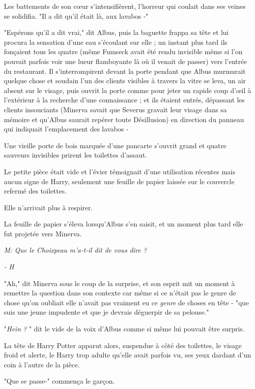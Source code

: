 Les battements de son cœur s'intensifièrent, l'horreur qui coulait dans ses veines se solidifia. "Il a dit qu'il était là, aux lavabos -"

"Espérons qu'il a dit vrai," dit Albus, puis la baguette frappa sa tête et lui procura la sensation d'une eau s'écoulant sur elle ; un instant plus tard ils fonçaient tous les quatre (même Fumseck avait été rendu invisible même si l'on pouvait parfois voir une lueur flamboyante là où il venait de passer) vers l'entrée du restaurant. Il s'interrompirent devant la porte pendant que Albus murmurait quelque chose et soudain l'un des clients visibles à travers la vitre se leva, un air absent sur le visage, puis ouvrit la porte comme pour jeter un rapide coup d'œil à l'extérieur à la recherche d'une connaissance ; et ils étaient entrés, dépassant les clients insouciants (Minerva savait que Severus gravait leur visage dans sa mémoire et qu'Albus saurait repérer toute Désillusion) en direction du panneau qui indiquait l'emplacement des lavabos -

Une vieille porte de bois marquée d'une pancarte s'ouvrit grand et quatre sauveurs invisibles prirent les toilettes d'assaut.

Le petite pièce était vide et l'évier témoignait d'une utilisation récentes mais aucun signe de Harry, seulement une feuille de papier laissée sur le couvercle refermé des toilettes.

Elle n'arrivait plus à respirer.

La feuille de papier s'éleva lorsqu'Albus s'en saisit, et un moment plus tard elle fut projetée vers Minerva.

\emph{M: Que le Choixpeau m'a-t-il dit de vous dire ?} 

\emph{- H} 

"Ah," dit Minerva sous le coup de la surprise, et son esprit mit un moment à remettre la question dans son contexte car même si ce n'était pas le genre de chose qu'on oubliait elle n'avait pas vraiment eu ce \emph{genre}  de choses en tête - "que suis une jeune impudente et que je devrais déguerpir de sa pelouse."

"\emph{Hein ?} " dit le vide de la voix d'Albus comme si même lui pouvait être surpris.

La tête de Harry Potter apparut alors, suspendue à côté des toilettes, le visage froid et alerte, le Harry trop adulte qu'elle avait parfois vu, ses yeux dardant d'un coin à l'autre de la pièce.

"Que se passe-" commença le garçon.

